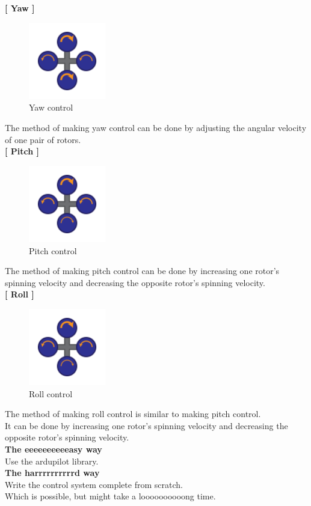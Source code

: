 \textbf{[ Yaw ]}\\
\begin{figure}[H]
  
  \centering
    \includegraphics[width=0.3\textwidth]{./Pictures/yaw.png}
    \caption{Yaw control}
\end{figure}
The method of making yaw control can be done by adjusting the angular velocity of one pair of rotors.\\
\textbf{[ Pitch ]}\\
\begin{figure}[H]
  
  \centering
    \includegraphics[width=0.3\textwidth]{./Pictures/pitch.png}
    \caption{Pitch control}
\end{figure}
The method of making pitch control can be done by increasing one rotor's spinning velocity and decreasing the opposite rotor's spinning velocity.\\
\textbf{[ Roll ]}\\
\begin{figure}[H]
  
  \centering
    \includegraphics[width=0.3\textwidth, angle=90]{./Pictures/pitch.png}
    \caption{Roll control}
\end{figure}
The method of making roll control is similar to making pitch control.\\
It can be done by increasing one rotor's spinning velocity and decreasing the opposite rotor's spinning velocity.\\

\textbf{The eeeeeeeeeeasy way}\\
Use the ardupilot\cite{cite2} library.\\
\textbf{The harrrrrrrrrrd way}\\
Write the control system complete from scratch.\\
Which is possible, but might take a loooooooooong time.